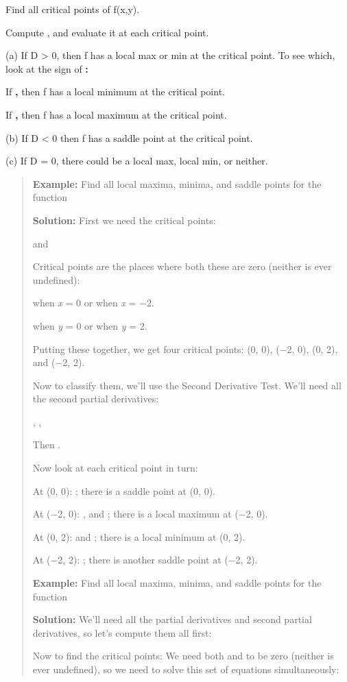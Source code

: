 Find all critical points of f(x,y).

Compute , and evaluate it at each critical point.

(a) If D \textgreater{} 0, then f has a local max or min at the critical
point. To see which, look at the sign of \textbf{:}

If \textbf{,} then f has a local minimum at the critical point.

If \textbf{,} then f has a local maximum at the critical point.

(b) If D \textless{} 0 then f has a saddle point at the critical point.

(c) If D = 0, there could be a local max, local min, or neither.

\begin{quote}
\textbf{Example:} Find all local maxima, minima, and saddle points for
the function

\textbf{Solution:} First we need the critical points:

and

Critical points are the places where both these are zero (neither is
ever undefined):

when \emph{x} = 0 or when \emph{x} = −2.

when \emph{y} = 0 or when \emph{y} = 2.

Putting these together, we get four critical points: (0, 0), (−2, 0),
(0, 2), and (−2, 2).

Now to classify them, we'll use the Second Derivative Test. We'll need
all the second partial derivatives:

, ,

Then .

Now look at each critical point in turn:

At (0, 0): ; there is a saddle point at (0, 0).

At (−2, 0): , and ; there is a local maximum at (−2, 0).

At (0, 2): and ; there is a local minimum at (0, 2).

At (−2, 2): ; there is another saddle point at (−2, 2).

\textbf{Example:} Find all local maxima, minima, and saddle points for
the function

\textbf{Solution:} We'll need all the partial derivatives and second
partial derivatives, so let's compute them all first:

Now to find the critical points: We need both and to be zero (neither is
ever undefined), so we need to solve this set of equations
simultaneously:


\end{quote}
